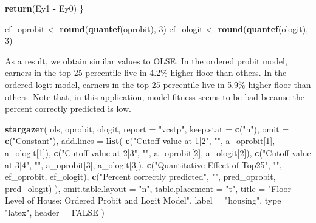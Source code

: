 \documentclass[
  12pt,
]{article}
\newenvironment{Shaded}{\begin{snugshade}}{\end{snugshade}}
\newcommand{\DataTypeTok}[1]{\textcolor[rgb]{0.13,0.29,0.53}{#1}}
\newcommand{\DecValTok}[1]{\textcolor[rgb]{0.00,0.00,0.81}{#1}}
\newcommand{\KeywordTok}[1]{\textcolor[rgb]{0.13,0.29,0.53}{\textbf{#1}}}
\newcommand{\NormalTok}[1]{#1}
\newcommand{\OperatorTok}[1]{\textcolor[rgb]{0.81,0.36,0.00}{\textbf{#1}}}
\newcommand{\OtherTok}[1]{\textcolor[rgb]{0.56,0.35,0.01}{#1}}
\newcommand{\StringTok}[1]{\textcolor[rgb]{0.31,0.60,0.02}{#1}}
\begin{document}
\begin{Shaded}
\begin{Highlighting}[]
  \KeywordTok{return}\NormalTok{(Ey1 }\OperatorTok{{-}}\StringTok{ }\NormalTok{Ey0)}
\NormalTok{\} }

\NormalTok{ef\_oprobit \textless{}{-}}\StringTok{ }\KeywordTok{round}\NormalTok{(}\KeywordTok{quantef}\NormalTok{(oprobit), }\DecValTok{3}\NormalTok{)}
\NormalTok{ef\_ologit \textless{}{-}}\StringTok{ }\KeywordTok{round}\NormalTok{(}\KeywordTok{quantef}\NormalTok{(ologit), }\DecValTok{3}\NormalTok{)}
\end{Highlighting}
\end{Shaded}

As a result, we obtain similar values to OLSE. In the ordered probit
model, earners in the top 25 percentile live in 4.2\% higher floor than
others. In the ordered logit model, earners in the top 25 percentile
live in 5.9\% higher floor than others. Note that, in this application,
model fitness seems to be bad because the percent correctly predicted is
low.

\begin{Shaded}
\begin{Highlighting}[]
\KeywordTok{stargazer}\NormalTok{(}
\NormalTok{  ols, oprobit, ologit,}
  \DataTypeTok{report =} \StringTok{"vcstp"}\NormalTok{, }\DataTypeTok{keep.stat =} \KeywordTok{c}\NormalTok{(}\StringTok{"n"}\NormalTok{),}
  \DataTypeTok{omit =} \KeywordTok{c}\NormalTok{(}\StringTok{"Constant"}\NormalTok{),}
  \DataTypeTok{add.lines =} \KeywordTok{list}\NormalTok{(}
    \KeywordTok{c}\NormalTok{(}\StringTok{"Cutoff value at 1|2"}\NormalTok{, }\StringTok{""}\NormalTok{, a\_oprobit[}\DecValTok{1}\NormalTok{], a\_ologit[}\DecValTok{1}\NormalTok{]),}
    \KeywordTok{c}\NormalTok{(}\StringTok{"Cutoff value at 2|3"}\NormalTok{, }\StringTok{""}\NormalTok{, a\_oprobit[}\DecValTok{2}\NormalTok{], a\_ologit[}\DecValTok{2}\NormalTok{]),}
    \KeywordTok{c}\NormalTok{(}\StringTok{"Cutoff value at 3|4"}\NormalTok{, }\StringTok{""}\NormalTok{, a\_oprobit[}\DecValTok{3}\NormalTok{], a\_ologit[}\DecValTok{3}\NormalTok{]),}
    \KeywordTok{c}\NormalTok{(}\StringTok{"Quantitative Effect of Top25"}\NormalTok{, }\StringTok{""}\NormalTok{, ef\_oprobit, ef\_ologit),}
    \KeywordTok{c}\NormalTok{(}\StringTok{"Percent correctly predicted"}\NormalTok{, }\StringTok{""}\NormalTok{, pred\_oprobit, pred\_ologit)}
\NormalTok{  ),}
  \DataTypeTok{omit.table.layout =} \StringTok{"n"}\NormalTok{, }\DataTypeTok{table.placement =} \StringTok{"t"}\NormalTok{,}
  \DataTypeTok{title =} \StringTok{"Floor Level of House: Ordered Probit and Logit Model"}\NormalTok{,}
  \DataTypeTok{label =} \StringTok{"housing"}\NormalTok{,}
  \DataTypeTok{type =} \StringTok{"latex"}\NormalTok{, }\DataTypeTok{header =} \OtherTok{FALSE}
\NormalTok{)}
\end{Highlighting}
\end{Shaded}
\end{document}
